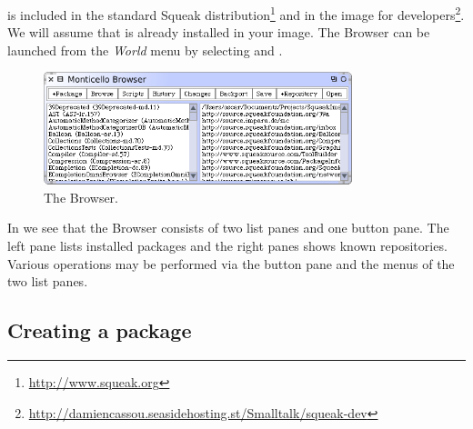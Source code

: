 \documentclass[a4paper,10pt,twoside]{book}
\begin{document}
\MC is included in the standard Squeak  distribution\footnote{\url{http://www.squeak.org}} and in the image for developers\footnote{\url{http://damiencassou.seasidehosting.st/Smalltalk/squeak-dev}}. 
We will assume that \MC is already installed in your image.
The \MC Browser can be launched from the \emph{World} menu by selecting  and .

\begin{figure}[ht]\centering
	\includegraphics[width=0.8\textwidth]{monticelloBrowser}
	\caption{The \MC Browser.}
\end{figure}

In  we see that the \MC Browser consists of two list panes and one button pane. The left pane lists installed packages and the right panes shows known repositories.
Various operations may be performed via the button pane and the menus of the two list panes.

\subsection{Creating a package}
\end{document}
